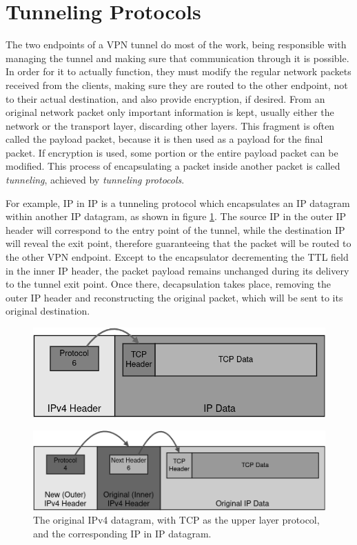 \documentclass[a4paper,12pt]{report}
\begin{document}
		\section{Tunneling Protocols}
		The two endpoints of a VPN tunnel do most of the work, being responsible with managing the tunnel and making sure that communication through it is possible. In order for it to actually function, they must modify the regular network packets received from the clients, making sure they are routed to the other endpoint, not to their actual destination, and also provide encryption, if desired. From an original network packet only important information is kept, usually either the network or the transport layer, discarding other layers. This fragment is often called the payload packet, because it is then used as a payload for the final packet. If encryption is used, some portion or the entire payload packet can be modified. This process of encapsulating a packet inside another packet is called \textit{tunneling}, achieved by \textit{tunneling protocols}.
		
		For example, IP in IP \cite{rfc2003} is a tunneling protocol which encapsulates an IP datagram within another IP datagram, as shown in figure \ref{fig:ip-in-ip_packet}. The source IP in the outer IP header will correspond to the entry point of the tunnel, while the destination IP will reveal the exit point, therefore guaranteeing that the packet will be routed to the other VPN endpoint. Except to the encapsulator decrementing the TTL field in the inner IP header, the packet payload remains unchanged during its delivery to the tunnel exit point. Once there, decapsulation takes place, removing the outer IP header and reconstructing the original packet, which will be sent to its original destination.
		\begin{figure}[h]
			\includegraphics[width=\textwidth,height=0.14\textheight,keepaspectratio]{original_ipv4_packet}
			\centering
		\end{figure}
		\begin{figure}[h]
			\includegraphics[width=\textwidth]{ip_in_ip}
			\centering
			\caption{The original IPv4 datagram, with TCP as the upper layer protocol, and the corresponding IP in IP datagram.}
			\label{fig:ip-in-ip_packet}
		\end{figure}
		
\end{document}
